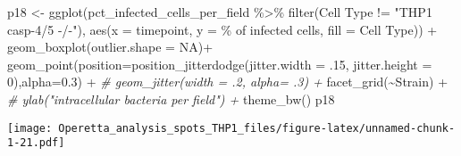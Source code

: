 \documentclass[
]{article}
\newenvironment{Shaded}{\begin{snugshade}}{\end{snugshade}}
\newcommand{\AttributeTok}[1]{\textcolor[rgb]{0.77,0.63,0.00}{#1}}
\newcommand{\CommentTok}[1]{\textcolor[rgb]{0.56,0.35,0.01}{\textit{#1}}}
\newcommand{\ConstantTok}[1]{\textcolor[rgb]{0.00,0.00,0.00}{#1}}
\newcommand{\DecValTok}[1]{\textcolor[rgb]{0.00,0.00,0.81}{#1}}
\newcommand{\FloatTok}[1]{\textcolor[rgb]{0.00,0.00,0.81}{#1}}
\newcommand{\FunctionTok}[1]{\textcolor[rgb]{0.00,0.00,0.00}{#1}}
\newcommand{\NormalTok}[1]{#1}
\newcommand{\OtherTok}[1]{\textcolor[rgb]{0.56,0.35,0.01}{#1}}
\newcommand{\SpecialCharTok}[1]{\textcolor[rgb]{0.00,0.00,0.00}{#1}}
\newcommand{\StringTok}[1]{\textcolor[rgb]{0.31,0.60,0.02}{#1}}
\begin{document}
\begin{Shaded}
\begin{Highlighting}[]
\NormalTok{p18 }\OtherTok{\textless{}{-}} \FunctionTok{ggplot}\NormalTok{(pct\_infected\_cells\_per\_field }\SpecialCharTok{\%\textgreater{}\%}
                \FunctionTok{filter}\NormalTok{(}\StringTok{\textasciigrave{}}\AttributeTok{Cell Type}\StringTok{\textasciigrave{}} \SpecialCharTok{!=} \StringTok{"THP1 casp{-}4/5 {-}/{-}"}\NormalTok{), }\FunctionTok{aes}\NormalTok{(}\AttributeTok{x =}\NormalTok{ timepoint, }\AttributeTok{y =} \StringTok{\textasciigrave{}}\AttributeTok{\% of infected cells}\StringTok{\textasciigrave{}}\NormalTok{, }\AttributeTok{fill =} \StringTok{\textasciigrave{}}\AttributeTok{Cell Type}\StringTok{\textasciigrave{}}\NormalTok{)) }\SpecialCharTok{+}
  \FunctionTok{geom\_boxplot}\NormalTok{(}\AttributeTok{outlier.shape =} \ConstantTok{NA}\NormalTok{)}\SpecialCharTok{+}
  \FunctionTok{geom\_point}\NormalTok{(}\AttributeTok{position=}\FunctionTok{position\_jitterdodge}\NormalTok{(}\AttributeTok{jitter.width =}\NormalTok{ .}\DecValTok{15}\NormalTok{, }\AttributeTok{jitter.height =} \DecValTok{0}\NormalTok{),}\AttributeTok{alpha=}\FloatTok{0.3}\NormalTok{) }\SpecialCharTok{+}
  \CommentTok{\#  geom\_jitter(width = .2, alpha= .3) +}
  \FunctionTok{facet\_grid}\NormalTok{(}\SpecialCharTok{\textasciitilde{}}\NormalTok{Strain) }\SpecialCharTok{+}
  \CommentTok{\#  ylab("intracellular bacteria per field") +}
  \FunctionTok{theme\_bw}\NormalTok{()}
\NormalTok{p18}
\end{Highlighting}
\end{Shaded}

\texttt{[image: Operetta\_analysis\_spots\_THP1\_files/figure-latex/unnamed-chunk-1-21.pdf]}
\end{document}
